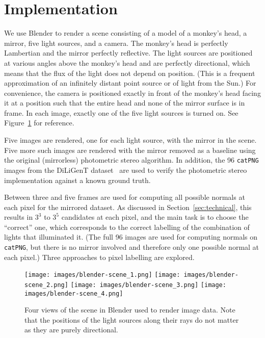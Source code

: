 \section{Implementation}\label{sec:implementation}
We use Blender to render a scene consisting of a model of a monkey's head, a
mirror, five light sources, and a camera. The monkey's head is perfectly
Lambertian and the mirror perfectly reflective. The light sources are
positioned at various angles above the monkey's head and are perfectly
directional, which means that the flux of the light does not depend on
position. (This is a frequent approximation of an infinitely distant point
source or of light from the Sun.) For convenience, the camera is positioned
exactly in front of the monkey's head facing it at a position such that the
entire head and none of the mirror surface is in frame. In each image, exactly
one of the five light sources is turned on. See Figure~\ref{fig:blender-scene}
for reference.

Five images are rendered, one for each light source, with the mirror in the
scene. Five more such images are rendered with the mirror removed as a baseline
using the original (mirrorless) photometric stereo algorithm. In addition, the
96 \texttt{catPNG} images from the DiLiGenT dataset~\cite{shi} are used to
verify the photometric stereo implementation against a known ground truth.

Between three and five frames are used for computing all possible normals at
each pixel for the mirrored dataset. As discussed in
Section~\ref{sec:technical}, this results in $3^3$ to $3^5$ candidates at each
pixel, and the main task is to choose the ``correct'' one, which corresponds to
the correct labelling of the combination of lights that illuminated it. (The
full 96 images are used for computing normals on \texttt{catPNG}, but there is
no mirror involved and therefore only one possible normal at each pixel.) Three
approaches to pixel labelling are explored.
\begin{figure}
  \texttt{[image: images/blender-scene\_1.png]}
  \nolinebreak
  \texttt{[image: images/blender-scene\_2.png]}
  \texttt{[image: images/blender-scene\_3.png]}
  \nolinebreak
  \texttt{[image: images/blender-scene\_4.png]}
  \caption{Four views of the scene in Blender used to render image data. Note
  that the positions of the light sources along their rays do not matter as
  they are purely directional.}\label{fig:blender-scene}
\end{figure}
